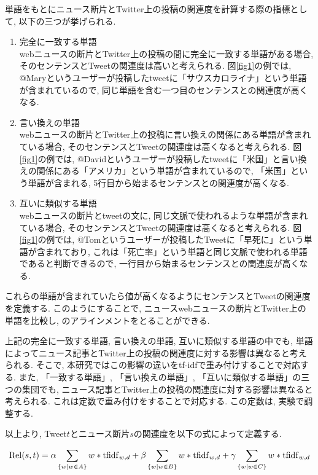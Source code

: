 \documentclass[12pt]{jarticle}
\begin{document}
単語をもとにニュース断片とTwitter上の投稿の関連度を計算する際の指標として, 以下の三つが挙げられる. 

\begin{enumerate}
 \item 完全に一致する単語\\
    webニュースの断片とTwitter上の投稿の間に完全に一致する単語がある場合, そのセンテンスとTweetの関連度は高いと考えられる. 図\ref{fig1}の例では, @Maryというユーザーが投稿したtweetに「サウスカロライナ」という単語が含まれているので, 同じ単語を含む一つ目のセンテンスとの関連度が高くなる. 
 \item 言い換えの単語\\
    webニュースの断片とTwitter上の投稿に言い換えの関係にある単語が含まれている場合, そのセンテンスとTweetの関連度は高くなると考えられる. 図\ref{fig1}の例では, @Davidというユーザーが投稿したtweetに「米国」と言い換えの関係にある「アメリカ」という単語が含まれているので, 「米国」という単語が含まれる, 5行目から始まるセンテンスとの関連度が高くなる. 
 \item 互いに類似する単語\\
    webニュースの断片とtweetの文に, 同じ文脈で使われるような単語が含まれている場合, そのセンテンスとTweetの関連度は高くなると考えられる. 図\ref{fig1}の例では, @Tomというユーザーが投稿したTweetに「早死に」という単語が含まれており, これは「死亡率」という単語と同じ文脈で使われる単語であると判断できるので, 一行目から始まるセンテンスとの関連度が高くなる. 
\end{enumerate}

これらの単語が含まれていたら値が高くなるようにセンテンスとTweetの関連度を定義する. このようにすることで, ニュースwebニュースの断片とTwitter上の単語を比較し, のアラインメントをとることができる. 

上記の完全に一致する単語, 言い換えの単語, 互いに類似する単語の中でも, 単語によってニュース記事とTwitter上の投稿の関連度に対する影響は異なると考えられる. そこで, 本研究ではこの影響の違いをtf-idfで重み付けすることで対応する. また, 「一致する単語」, 「言い換えの単語」, 「互いに類似する単語」の三つの集団でも, ニュース記事とTwitter上の投稿の関連度に対する影響は異なると考えられる. これは定数で重み付けをすることで対応する. この定数は, 実験で調整する. 

以上より, Tweet$t$とニュース断片$s$の関連度を以下の式によって定義する. 

\begin{equation}
  {\rm Rel}(s, t) = \alpha \sum_{\{w|w \in A\}} w * {\rm tfidf}_{w, d} +
                    \beta  \sum_{\{w|w \in B\}} w * {\rm tfidf}_{w, d} +
                    \gamma \sum_{\{w|w \in C\}} w * {\rm tfidf}_{w, d}
  \label{eq:rel}
\end{equation}
\end{document}
